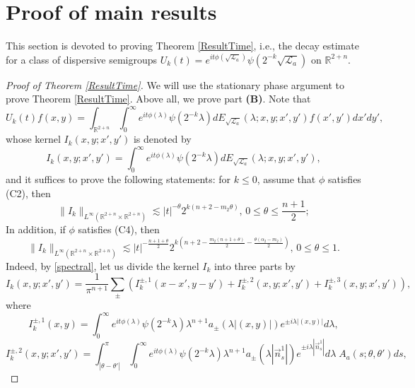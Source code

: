 \documentclass[a4paper,11pt, reqno]{amsart}
\numberwithin{equation}{section}
\theoremstyle{plain}
\theoremstyle{definition}
\theoremstyle{remark}
\begin{document}
\section{Proof of main results}\label{Proof of Main}
This section is devoted to proving Theorem \ref{ResultTime}, i.e., the decay estimate for a class of
dispersive semigroups $U_k(t)=e^{it\phi(\sqrt{\mathcal{L}_a})}\psi(2^{-k}\sqrt{\mathcal{L}_a})$ on $\mathbb{R}^{2+n}$.
 \begin{proof}[Proof of Theorem \ref{ResultTime}]
We will use the stationary phase argument to prove Theorem \ref{ResultTime}. Above all, we prove part \textbf{(B)}. Note that 
\begin{equation*}
U_k(t)f(x,y)=\int_{\mathbb{R}^{2+n}}\int_0^\infty e^{it\phi(\lambda)} \psi(2^{-k}\lambda)dE_{\sqrt{\mathcal{L}_a}}(\lambda; x,y; x',y')f(x',y')dx'dy',
\end{equation*}
whose kernel $I_k(x,y;x',y')$ is denoted by 
\begin{equation*}
I_k(x,y;x',y')=\int_0^\infty e^{it\phi(\lambda)} \psi(2^{-k}\lambda)dE_{\sqrt{\mathcal{L}_a}}(\lambda; x,y; x',y'),
\end{equation*}
and it suffices to prove the following statements: for $k \leq 0$, assume that $\phi$ satisfies (C2), then
	\begin{equation*}
	\|I_k\|_{L^\infty(\mathbb{R}^{2+n}\times\mathbb{R}^{2+n})} \lesssim |t|^{-\theta}2^{k\left(n+2-m_2\theta\right)},\,0 \leq \theta \leq \frac{n+1}{2};
	\end{equation*}
 In addition, if $\phi$ satisfies (C4), then
	\begin{equation*}
	\|I_k\|_{L^\infty(\mathbb{R}^{2+n}\times\mathbb{R}^{2+n})} \lesssim |t|^{-\frac{n+1+\theta}{2}}2^{k\left(n+2-\frac{m_2(n+1+\theta)}{2}-\frac{\theta(\alpha_2-m_2)}{2}\right)},\,   0 \leq \theta \leq 1.
	\end{equation*}
Indeed, by \eqref{spectral}, let us divide the kernel $I_k$ into three parts by
\begin{equation*}
I_k(x,y;x',y')=\frac{1}{\pi^{n+1}}\sum_{\pm}\left(I_k^{\pm,1}(x-x',y-y')+I_k^{\pm,2}(x,y;x',y')+I_k^{\pm,3}(x,y;x',y')\right), 
\end{equation*}
where
\begin{equation*}
I_k^{\pm,1}(x,y)=\int_0^\infty e^{it\phi(\lambda)} \psi(2^{-k}\lambda)\lambda^{n+1}a_{\pm}(\lambda|(x,y)|)e^{\pm i\lambda|(x,y)|}d\lambda,
\end{equation*}
\begin{equation*}
I_k^{\pm,2}(x,y;x',y')=\int_{|\theta-\theta'|}^\pi \int_0^\infty  e^{it\phi(\lambda)} \psi(2^{-k}\lambda)\lambda^{n+1}a_{\pm}(\lambda|\overset{\rightarrow}{n}_s^1|)e^{\pm i\lambda|\overset{\rightarrow}{n}_s^1|}d\lambda\; A_a(s;\theta,\theta')ds,

\end{equation*}
\end{proof}
\end{document}
